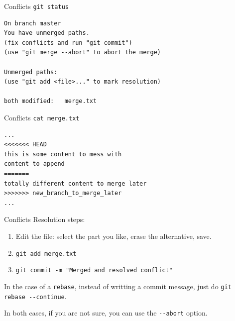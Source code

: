 \documentclass[usenames,dvipsnames,9pt]{beamer}
\begin{document}
%
\begin{frame}[fragile]{Conflicts}
  \lstinline|git status|

  \begin{lstlisting}[basicstyle=\footnotesize\ttfamily]
On branch master
You have unmerged paths.
(fix conflicts and run "git commit")
(use "git merge --abort" to abort the merge)

Unmerged paths:
(use "git add <file>..." to mark resolution)

both modified:   merge.txt
  \end{lstlisting}
\end{frame}

%
\begin{frame}[fragile]{Conflicts}
  \lstinline|cat merge.txt|

  \begin{lstlisting}[basicstyle=\footnotesize\ttfamily]
...
<<<<<<< HEAD
this is some content to mess with
content to append
=======
totally different content to merge later
>>>>>>> new_branch_to_merge_later
...
  \end{lstlisting}
\end{frame}

%
\begin{frame}{Conflicts}
  Resolution steps:
  \begin{enumerate}
    \item Edit the file: select the part you like, erase the alternative, save.
    \item \lstinline|git add merge.txt|
    \item \lstinline|git commit -m "Merged and resolved conflict"|
  \end{enumerate}

  In the case of a \lstinline|rebase|, instead of writting a commit message, just do
  \lstinline|git rebase --continue|.

  In both cases, if you are not sure, you can use the \lstinline|--abort| option.
\end{frame}



%
%
\end{document}
